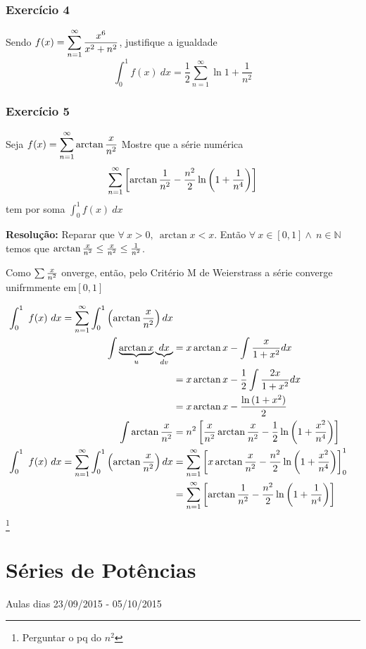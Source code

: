 \documentclass[12pt,openany, letterpaper]{book}
\newcommand{\soma}[2][n]{\sum_{{#1} = #2}^\infty}
\newcommand{\E}[1]{Exercício #1}
\newcommand{\cmw}{Critério M de Weierstrass }
\begin{document}
{\subsection*{\E{4}}{Sendo $\displaystyle{f(x) = \soma{1}  {x^6 \over x^2+n^2}}$, justifique a igualdade $$\int_0^1 f(x) \ dx = \frac{1}{2}\soma{1}\ln{1+ \frac{1}{n^2}}$$}

\subsection*{\E{5}}{Seja $\displaystyle{f(x) = \soma{1} \arctan {x \over n^2}}$ Mostre que a série numérica $$\soma{1} \left[ \arctan{1 \over n^2} - \frac{n^2}{2} \ln \left(1+\frac{1}{n^4}\right) \right]$$ tem por soma $\displaystyle{\int_0^1 f(x) \ dx}$ 

\textbf{Resolução:} Reparar que $\forall \ x > 0, \ \arctan{x} < x$. Então $\forall \ x \in [0,1] \land \ n \in \mathds{N}$ temos que $\arctan{x \over n^2} \leq {x \over n^2} \leq {1 \over n^2}$.\vspace{2mm}


Como $\sum{x \over n^2}$ onverge, então, pelo \cmw a série converge unifrmmente em$[0,1]$

\begin{align*}
\int_0^1 \ f(x) \ dx = \soma{1} \int_0^1 \left( \arctan{x \over n^2}\right)dx \\
\int \underbrace{\arctan{x}}_{u}\underbrace{dx}_{dv} &= x\arctan{x} - \int {x \over 1+x^2}dx \\
&= x \arctan{x} - \frac{1}{2}\int {2x \over 1+x^2}dx\\
&= x \arctan{x} - \frac{\ln{(1+x^2)}}{2}\\
\int \arctan{x \over n^2} &= n^2 \left[ {x \over n^2}\arctan{x \over n^2} - \frac{1}{2}\ln{\left(1 + {x^2 \over n^4}\right)}\right]\\
\int_0^1 \ f(x) \ dx = \soma{1} \int_0^1 \left( \arctan{x \over n^2}\right)dx &= \soma{1} \left[x \arctan{x \over n^2} - \frac{n^2}{2}\ln{\left(1 + {x^2 \over n^4}\right)} \right]_0^1 \\
&= \soma{1} \left[\arctan{1 \over n^2} - \frac{n^2}{2}\ln{\left(1 + {1 \over n^4}\right)} \right]
\end{align*}
\footnote{Perguntar o pq do $n^2$}

\chapter{Séries de Potências}{Aulas dias 23/09/2015 - 05/10/2015}
\label{chap:c5}

}}
\end{document}
